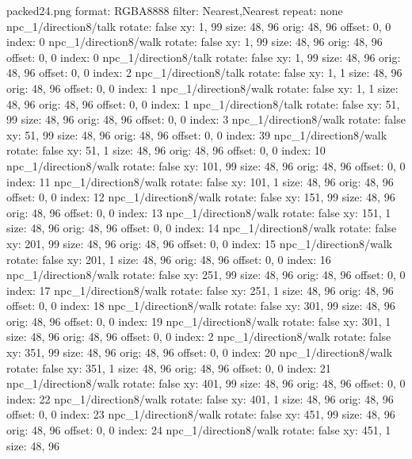 packed24.png
format: RGBA8888
filter: Nearest,Nearest
repeat: none
npc_1/direction8/talk
  rotate: false
  xy: 1, 99
  size: 48, 96
  orig: 48, 96
  offset: 0, 0
  index: 0
npc_1/direction8/walk
  rotate: false
  xy: 1, 99
  size: 48, 96
  orig: 48, 96
  offset: 0, 0
  index: 0
npc_1/direction8/talk
  rotate: false
  xy: 1, 99
  size: 48, 96
  orig: 48, 96
  offset: 0, 0
  index: 2
npc_1/direction8/talk
  rotate: false
  xy: 1, 1
  size: 48, 96
  orig: 48, 96
  offset: 0, 0
  index: 1
npc_1/direction8/walk
  rotate: false
  xy: 1, 1
  size: 48, 96
  orig: 48, 96
  offset: 0, 0
  index: 1
npc_1/direction8/talk
  rotate: false
  xy: 51, 99
  size: 48, 96
  orig: 48, 96
  offset: 0, 0
  index: 3
npc_1/direction8/walk
  rotate: false
  xy: 51, 99
  size: 48, 96
  orig: 48, 96
  offset: 0, 0
  index: 39
npc_1/direction8/walk
  rotate: false
  xy: 51, 1
  size: 48, 96
  orig: 48, 96
  offset: 0, 0
  index: 10
npc_1/direction8/walk
  rotate: false
  xy: 101, 99
  size: 48, 96
  orig: 48, 96
  offset: 0, 0
  index: 11
npc_1/direction8/walk
  rotate: false
  xy: 101, 1
  size: 48, 96
  orig: 48, 96
  offset: 0, 0
  index: 12
npc_1/direction8/walk
  rotate: false
  xy: 151, 99
  size: 48, 96
  orig: 48, 96
  offset: 0, 0
  index: 13
npc_1/direction8/walk
  rotate: false
  xy: 151, 1
  size: 48, 96
  orig: 48, 96
  offset: 0, 0
  index: 14
npc_1/direction8/walk
  rotate: false
  xy: 201, 99
  size: 48, 96
  orig: 48, 96
  offset: 0, 0
  index: 15
npc_1/direction8/walk
  rotate: false
  xy: 201, 1
  size: 48, 96
  orig: 48, 96
  offset: 0, 0
  index: 16
npc_1/direction8/walk
  rotate: false
  xy: 251, 99
  size: 48, 96
  orig: 48, 96
  offset: 0, 0
  index: 17
npc_1/direction8/walk
  rotate: false
  xy: 251, 1
  size: 48, 96
  orig: 48, 96
  offset: 0, 0
  index: 18
npc_1/direction8/walk
  rotate: false
  xy: 301, 99
  size: 48, 96
  orig: 48, 96
  offset: 0, 0
  index: 19
npc_1/direction8/walk
  rotate: false
  xy: 301, 1
  size: 48, 96
  orig: 48, 96
  offset: 0, 0
  index: 2
npc_1/direction8/walk
  rotate: false
  xy: 351, 99
  size: 48, 96
  orig: 48, 96
  offset: 0, 0
  index: 20
npc_1/direction8/walk
  rotate: false
  xy: 351, 1
  size: 48, 96
  orig: 48, 96
  offset: 0, 0
  index: 21
npc_1/direction8/walk
  rotate: false
  xy: 401, 99
  size: 48, 96
  orig: 48, 96
  offset: 0, 0
  index: 22
npc_1/direction8/walk
  rotate: false
  xy: 401, 1
  size: 48, 96
  orig: 48, 96
  offset: 0, 0
  index: 23
npc_1/direction8/walk
  rotate: false
  xy: 451, 99
  size: 48, 96
  orig: 48, 96
  offset: 0, 0
  index: 24
npc_1/direction8/walk
  rotate: false
  xy: 451, 1
  size: 48, 96
